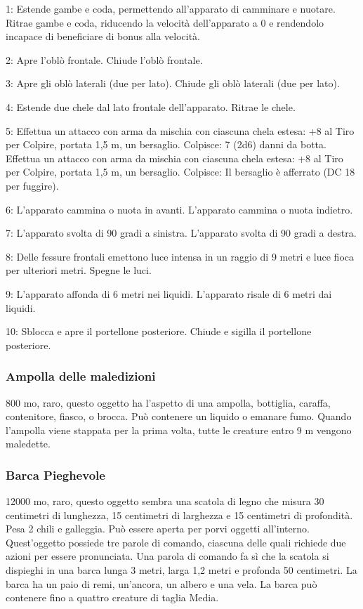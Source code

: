 \begin{multicols}{2}
1: Estende gambe e coda, permettendo all'apparato di camminare e nuotare. Ritrae gambe e coda, riducendo la velocità dell'apparato a 0 e rendendolo incapace di beneficiare di bonus alla velocità.

2: Apre l'oblò frontale. Chiude l'oblò frontale.

3: Apre gli oblò laterali (due per lato). Chiude gli oblò laterali (due per lato).

4: Estende due chele dal lato frontale dell'apparato. Ritrae le chele.

5: Effettua un attacco con arma da mischia con ciascuna chela estesa: +8 al Tiro per Colpire, portata 1,5 m, un bersaglio. Colpisce: 7 (2d6) danni da botta. Effettua un attacco con arma da mischia con ciascuna chela estesa: +8 al Tiro per Colpire, portata 1,5 m, un bersaglio. Colpisce: Il bersaglio è afferrato (DC 18 per fuggire).

6: L'apparato cammina o nuota in avanti. L'apparato cammina o nuota indietro.

7: L'apparato svolta di 90 gradi a sinistra. L'apparato svolta di 90 gradi a destra.

8: Delle fessure frontali emettono luce intensa in un raggio di 9 metri e luce fioca per ulteriori metri. Spegne le luci.

9: L'apparato affonda di 6 metri nei liquidi. L'apparato risale di 6 metri dai liquidi.

10: Sblocca e apre il portellone posteriore. Chiude e sigilla il portellone posteriore.


\subsubsection*{Ampolla delle maledizioni}
800 mo, raro, questo oggetto ha l’aspetto di una ampolla, bottiglia, caraffa, contenitore, fiasco, o brocca. Può contenere un liquido o emanare fumo. Quando l’ampolla viene stappata per la prima volta, tutte le creature entro 9 m vengono maledette.

\subsubsection*{Barca Pieghevole}
12000 mo, raro, questo oggetto sembra una scatola di legno che misura 30 centimetri di lunghezza, 15 centimetri di larghezza e 15 centimetri di profondità. Pesa 2 chili e galleggia. Può essere aperta per porvi oggetti all'interno. Quest'oggetto possiede tre parole di comando, ciascuna delle quali richiede due azioni per essere pronunciata. Una parola di comando fa sì che la scatola si dispieghi in una barca lunga 3 metri, larga 1,2 metri e profonda 50 centimetri. La barca ha un paio di remi, un'ancora, un albero e una vela. La barca può contenere fino a quattro creature di taglia Media.


\end{multicols}
